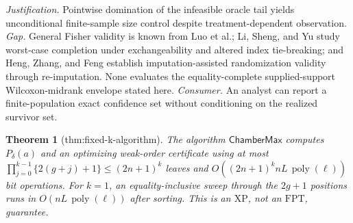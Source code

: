 \documentclass{article}
\newtheorem{theorem}{Theorem}
\begin{document}
\par\smallskip\noindent \textit{Justification.} Pointwise domination of the infeasible oracle tail yields unconditional finite-sample size control despite treatment-dependent observation. \textit{Gap.} General Fisher validity is known from Luo et al.; Li, Sheng, and Yu study worst-case completion under exchangeability and altered index tie-breaking; and Heng, Zhang, and Feng establish imputation-assisted randomization validity through re-imputation. None evaluates the equality-complete supplied-support Wilcoxon-midrank envelope stated here. \textit{Consumer.} An analyst can report a finite-population exact confidence set without conditioning on the realized survivor set.

\begin{theorem}[thm:fixed-k-algorithm]\label{thm:fixed-k-algorithm}
The algorithm \(\mathsf{ChamberMax}\) computes \(P_\delta(a)\) and an optimizing weak-order certificate using at most \(\prod_{j=0}^{k-1}\{2(g+j)+1\}\le(2n+1)^k\) leaves and \(O((2n+1)^k nL\,\operatorname{poly}(\ell))\) bit operations. For \(k=1\), an equality-inclusive sweep through the \(2g+1\) positions runs in \(O(nL\,\operatorname{poly}(\ell))\) after sorting. This is an \(\mathrm{XP}\), not an \(\mathrm{FPT}\), guarantee.
\end{theorem}
\end{document}
